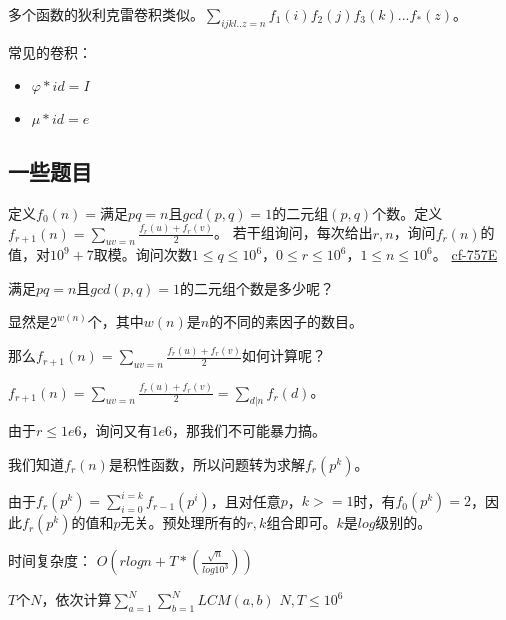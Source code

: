 \begin{note}
多个函数的狄利克雷卷积类似。$\sum_{ijkl..z=n}f_1(i)f_2(j)f_3(k)...f_{*}(z)$。
\end{note}

\vbox{}

常见的卷积：
\begin{itemize}
\item $\varphi * id = I$
\item $\mu * id = e$
\end{itemize}



\subsection{一些题目}

\begin{example}
定义$f_0(n)=$满足$pq=n$且$gcd(p,q)=1$的二元组$(p,q)$个数。定义$f_{r+1}(n) = \sum_{uv=n}\frac{f_r(u)+f_r(v)}{2}$。
若干组询问，每次给出$r,n$，询问$f_r(n)$的值，对$10^9+7$取模。询问次数$1\le q\le 10^6$，$0\le r\le 10^6$，$1\le n\le 10^6$。
\href{http://codeforces.com/contest/757/problem/E}{cf-757E}
\end{example}

\begin{solution}
满足$pq=n$且$gcd(p,q)=1$的二元组个数是多少呢？

显然是$2^{w(n)}$个，其中$w(n)$是$n$的不同的素因子的数目。

那么$f_{r+1}(n)=\sum_{uv=n}\frac{f_r(u)+f_r(v)}{2}$如何计算呢？

$f_{r+1}(n)=\sum_{uv=n}\frac{f_r(u)+f_r(v)}{2}=\sum_{d|n}f_r(d)$。 

由于$r\le 1e6$，询问又有$1e6$，那我们不可能暴力搞。

我们知道$f_r(n)$是积性函数，所以问题转为求解$f_r(p^k)$。

由于$f_r(p^k)=\sum_{i=0}^{i=k}f_{r-1}(p^i)$，且对任意$p$，$k>=1$时，有$f_0(p^k)=2$，因此$f_r(p^k)$的值和$p$无关。预处理所有的$r,k$组合即可。$k$是$log$级别的。

{\heiti 时间复杂度：}  $O(rlogn+T*(\frac{\sqrt{n}}{log10^3}))$   
\end{solution}



\vbox{}

\begin{example}
$T$个$N$，依次计算$\sum_{a=1}^{N}\sum_{b=1}^NLCM(a,b)$ \quad             $N,T\le 10^6$
\end{example}

